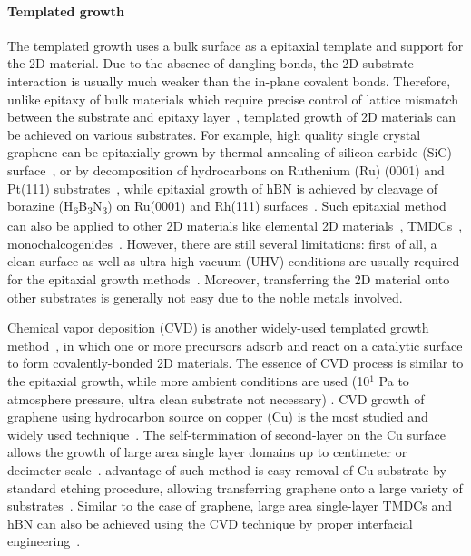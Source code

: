 \paragraph{Templated growth}
The templated growth uses a bulk surface as a epitaxial template and
support for the 2D material. Due to the absence of dangling bonds, the
2D-substrate interaction is usually much weaker than the in-plane
covalent bonds. Therefore, unlike epitaxy of bulk materials which
require precise control of lattice mismatch between the substrate and
epitaxy
layer~\cite{Koma_1985_vdWE,Ueno_1990_vdWE,Parkinson_1991_vdWE},
templated growth of 2D materials can be achieved on various
substrates. For example, high quality single crystal graphene can be
epitaxially grown by thermal annealing of silicon carbide (SiC)
surface~\cite{Berger_2004_sic,de_Heer_2007_epi_gr}, or by decomposition of
hydrocarbons on Ruthenium (Ru) (0001) and Pt(111)
substrates~\cite{Sutter_2008_gr_Ru,Sutter_2009_Gr_Pt}, while epitaxial
growth of hBN is achieved by cleavage of borazine
(H\textsubscript{6}B\textsubscript{3}N\textsubscript{3}) on Ru(0001)
and Rh(111)
surfaces~\cite{Goriachko_2007_assembl_hBN_ru,Goriachko_2008_AuNP_moire_hBN}.
%
Such epitaxial method can also be applied to other 2D materials like
elemental 2D
materials~\cite{Aufray_2010_silicene,Liu_2017_assemb_borophene},
TMDCs~\cite{Ugeda_2015_deposition},
monochalcogenides~\cite{Yang_2017_InSe}.
%
However, there are still several limitations: first of all, a clean
surface as well as ultra-high vacuum (UHV) conditions are usually
required for the epitaxial growth
methods~\cite{Liu_2018_rev}.
%
Moreover, transferring the 2D material
onto other substrates is generally not easy due to the noble metals
involved.
%

Chemical vapor deposition (CVD) is another widely-used templated
growth
method~\cite{Li_2016_cvd_rev,Novoselov_2016_vdW,Lin_2019_gr_rev_growth},
in which one or more precursors adsorb and react on a catalytic
surface to form covalently-bonded 2D materials.
%
The essence of CVD process is similar to the epitaxial growth, while
more ambient conditions are used (10$^{1}$ Pa to atmosphere pressure,
ultra clean substrate not necessary) \cite{Li_2016_cvd_rev}.
%
CVD growth of graphene using hydrocarbon source on copper (Cu) is the
most studied and widely used technique~\cite{Li_2016_cvd_rev}.
%
The self-termination of second-layer on the Cu surface allows the
growth of large area single layer domains up to centimeter or
decimeter
scale~\cite{Li_2011_single_crystal,Bae_2010_gr_roll,Xu_2017_gr_single_large}.
advantage of such method is easy removal of Cu substrate by standard
etching procedure, allowing transferring graphene onto a large variety
of substrates~\cite{Kim_2009_gr_transparent}.
%
Similar to the case of graphene, large area single-layer TMDCs and hBN
can also be achieved using the CVD technique by proper interfacial
engineering~\cite{Shi_2012_vdw_epi_MoS2_gr,Lee_2018_gold_BN}.
%

